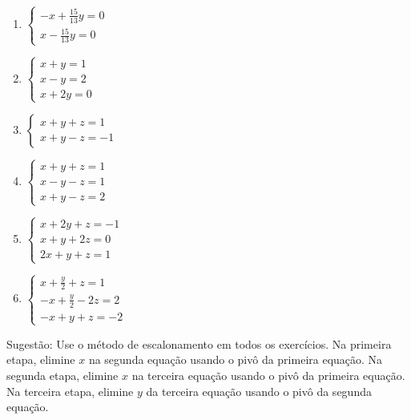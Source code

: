 \documentclass[a4paper]{article}
\begin{document}
\begin{enumerate}
\begin{enumerate}
  \item $\left\{
      \begin{array}{ll}  
        -x + \frac{15}{13}y = 0\\
        x - \frac{15}{13}y = 0
      \end{array}
    \right.$

  \item $\left\{
      \begin{array}{ll}  
        x + y = 1\\
        x - y = 2\\
        x + 2y = 0
      \end{array}
    \right.$

  \item $\left\{
      \begin{array}{ll}  
        x + y + z = 1\\
        x + y - z = -1
      \end{array}
    \right.$

  \item $\left\{
      \begin{array}{ll}  
        x + y + z =1\\
        x -y -z = 1\\
        x +y -z = 2
      \end{array}
    \right.$

  \item $\left\{
      \begin{array}{ll}  
        x + 2y +z = -1\\
        x + y +2z = 0\\
        2x + y +z =1
      \end{array}
    \right.$

  \item $\left\{
      \begin{array}{ll}  
        x +\frac{y}{2} + z = 1\\
        -x + \frac{y}{2} -2z = 2\\
        -x + y + z = -2
      \end{array}
    \right.$

  \end{enumerate}
\end{enumerate}

Sugestão: Use o método de escalonamento em todos os exercícios. Na
primeira etapa, elimine $x$ na segunda equação usando o pivô da
primeira equação. Na segunda etapa, elimine $x$ na terceira equação
usando o pivô da primeira equação. Na terceira etapa, elimine $y$ da
terceira equação usando o pivô da segunda equação.
\end{document}
